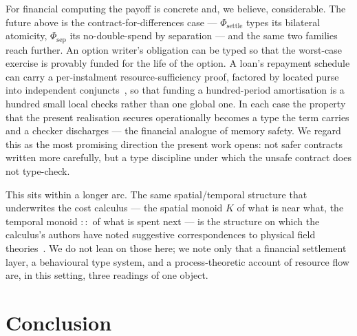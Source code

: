\documentclass[11pt]{article}
\theoremstyle{definition}
\theoremstyle{plain}
\begin{document}
For financial computing the payoff is concrete and, we believe, considerable. The future above is the
contract-for-differences case --- $\Phi_{\mathrm{settle}}$ types its bilateral atomicity,
$\Phi_{\mathrm{sep}}$ its no-double-spend by separation --- and the same two families reach further. An option
writer's obligation can be typed so that the worst-case exercise is provably funded for the life of
the option. A loan's repayment schedule can carry a per-instalment resource-sufficiency proof,
factored by located purse into independent conjuncts~\cite[\S12.2]{CGC2026}, so that funding a
hundred-period amortisation is a hundred small local checks rather than one global one. In each case
the property that the present realisation secures operationally becomes a type the term carries and a
checker discharges --- the financial analogue of memory safety. We regard this as the most promising
direction the present work opens: not safer contracts written more carefully, but a type discipline
under which the unsafe contract does not type-check.

This sits within a longer arc. The same spatial/temporal structure that underwrites the cost
calculus --- the spatial monoid $K$ of what is near what, the temporal monoid $::$ of what is spent
next --- is the structure on which the calculus's authors have noted suggestive correspondences to
physical field theories~\cite[\S13]{CGC2026}. We do not lean on those here; we note only that a
financial settlement layer, a behavioural type system, and a process-theoretic account of resource
flow are, in this setting, three readings of one object.

\section{Conclusion}\label{sec:conclusion}
\end{document}
